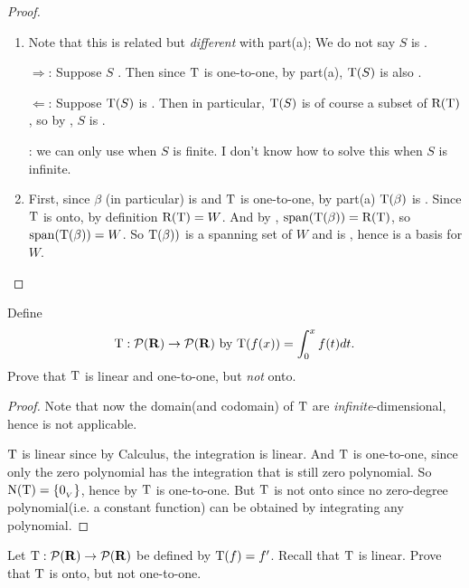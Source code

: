 \begin{proof}
\begin{enumerate}
\item Note that this is related but \emph{different} with part(a);
    We do not say \(S\) is \LID{}.

\(\Longrightarrow\): Suppose \(S\) \LID{}.
    Then since \(\mathrm{T}\) is one-to-one, by part(a), \(\mathrm{T}(S)\) is also \LID{}.

\(\Longleftarrow\): Suppose \(\mathrm{T}(S)\) is \LID{}.
    Then in particular, \(\mathrm{T}(S)\) is of course a subset of \(\mathrm{R(T)}\), so by , \(S\) is \LID{}.
    
    : we can only use  when \(S\) is finite.
    I don't know how to solve this when \(S\) is infinite.

\item First, since \(\beta\) (in particular) is \LID{} and \(\mathrm{T}\) is one-to-one, by part(a) \(\mathrm{T}(\beta)\) is \LID{}.
Since \(\mathrm{T}\) is onto, by definition \(\mathrm{R(T)} = W\).
And by , \(\operatorname{span}(\mathrm{T}(\beta)) = \mathrm{R(T)}\), so \(\operatorname{span}(\mathrm{T}(\beta)) = W\).
So \(\mathrm{T}(\beta))\) is a spanning set of \(W\) and is \LID{}, hence is a basis for \(W\).
\end{enumerate}
\end{proof}

\begin{exercise} \label{exercise 2.1.15}
Define
\[
    \mathrm{T} : \mathcal{P}(\mathbf{R}) \to \mathcal{P}(\mathbf{R}) \text{ by } \mathrm{T}(f(x)) = \int_0^x f(t) dt.
\]
Prove that \(\mathrm{T}\) is linear and one-to-one, but \emph{not} onto.
\end{exercise}

\begin{proof}
Note that now the domain(and codomain) of \(\mathrm{T}\) are \emph{infinite}-dimensional, hence  is not applicable.

\(\mathrm{T}\) is linear since by Calculus, the integration is linear.
And \(\mathrm{T}\) is one-to-one, since only the zero polynomial has the integration that is still zero polynomial.
So \(\mathrm{N(T)} = \{ 0_{_V} \}\), hence by  \(\mathrm{T}\) is one-to-one.
But \(\mathrm{T}\) is not onto since no zero-degree polynomial(i.e. a constant function) can be obtained by integrating any polynomial.
\end{proof}

\begin{exercise} \label{exercise 2.1.16}
Let \(\mathrm{T} : \mathcal{P}(\mathbf{R}) \to \mathcal{P}(\mathbf{R})\) be defined by \(\mathrm{T}(f) = f'\).
Recall that \(\mathrm{T}\) is linear.
Prove that \(\mathrm{T}\) is onto, but not one-to-one.
\end{exercise}

